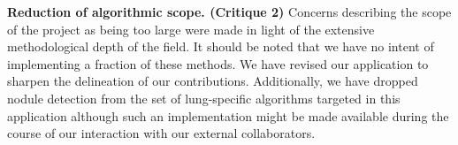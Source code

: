 \documentclass[11pt,]{article}
\begin{document}
\textbf{Reduction of algorithmic scope. (Critique 2)} Concerns
describing the scope of the project as being too large were made in
light of the extensive methodological depth of the field. It should be
noted that we have no intent of implementing a fraction of these
methods. We have revised our application to sharpen the delineation of
our contributions. Additionally, we have dropped nodule detection from
the set of lung-specific algorithms targeted in this application
although such an implementation might be made available during the
course of our interaction with our external collaborators.

\hypertarget{refs}{}
\end{document}

